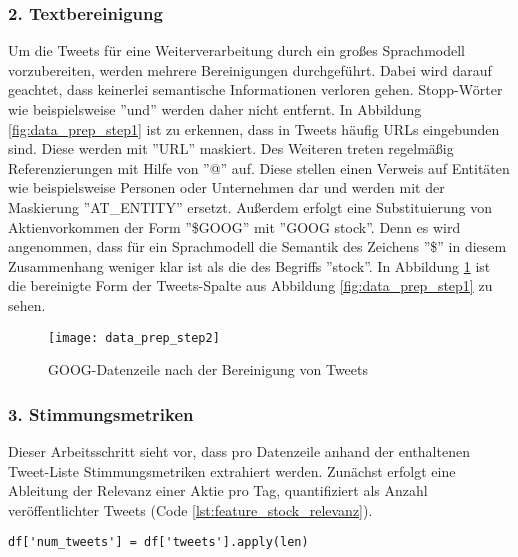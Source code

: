 \subsubsection*{2. Textbereinigung}
Um die Tweets für eine Weiterverarbeitung durch ein großes Sprachmodell vorzubereiten, werden mehrere Bereinigungen durchgeführt. Dabei wird darauf geachtet, dass keinerlei semantische Informationen verloren gehen. Stopp-Wörter wie beispielsweise ''und'' werden daher nicht entfernt.
In Abbildung \ref{fig:data_prep_step1} ist zu erkennen, dass in Tweets häufig URLs eingebunden sind. Diese werden mit ''URL'' maskiert.
Des Weiteren treten regelmäßig Referenzierungen mit Hilfe von ''@'' auf. Diese stellen einen Verweis auf Entitäten wie beispielsweise Personen oder Unternehmen dar und werden mit der Maskierung ''AT\_ENTITY'' ersetzt. 
Außerdem erfolgt eine Substituierung von Aktienvorkommen der Form ''\$GOOG'' mit ''GOOG stock''. Denn es wird angenommen, dass für ein Sprachmodell die Semantik des Zeichens ''\$'' in diesem Zusammenhang weniger klar ist als die des Begriffs ''stock''. In Abbildung \ref{fig:data_prep_step2} ist die bereinigte Form der Tweets-Spalte aus Abbildung \ref{fig:data_prep_step1} zu sehen.
\begin{figure}[H]
	\texttt{[image: data\_prep\_step2]}
	\caption{GOOG-Datenzeile nach der Bereinigung von Tweets}
	\label{fig:data_prep_step2}
\end{figure}


\subsubsection*{3. Stimmungsmetriken}

Dieser Arbeitsschritt sieht vor, dass pro Datenzeile anhand der enthaltenen Tweet-Liste Stimmungsmetriken extrahiert werden. Zunächst erfolgt eine Ableitung der Relevanz einer Aktie pro Tag, quantifiziert als Anzahl veröffentlichter Tweets (Code \ref{lst:feature_stock_relevanz}).
\begin{lstlisting}[caption={Relevanz quantifiziert als Anzahl-Tweets}, label=lst:feature_stock_relevanz, captionpos=t]
df['num_tweets'] = df['tweets'].apply(len)
\end{lstlisting}

